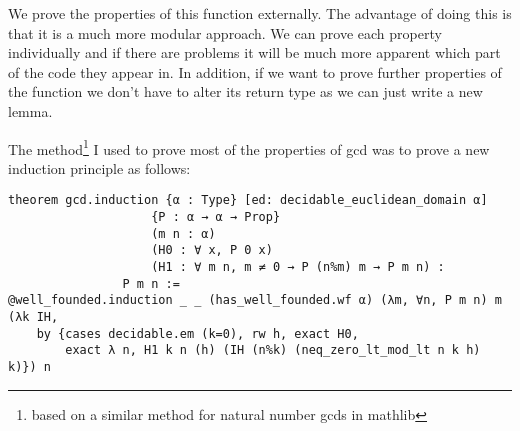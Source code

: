 \documentclass{article}
\begin{document}
We prove the properties of this function externally. 
The advantage of doing this is that it is a much more modular approach.
We can prove each property individually and if there are problems it will be much more apparent which part of the code they appear in.
In addition, if we want to prove further properties of the function we don't have to alter its return type as we can just write a new lemma.

The method\footnote{based on a similar method for natural number gcds in mathlib} I used to prove most of the properties of gcd was to prove a new induction principle as follows:
\begin{lstlisting}
theorem gcd.induction {α : Type} [ed: decidable_euclidean_domain α] 
                    {P : α → α → Prop}
                    (m n : α)
                    (H0 : ∀ x, P 0 x)
                    (H1 : ∀ m n, m ≠ 0 → P (n%m) m → P m n) :
                P m n := 
@well_founded.induction _ _ (has_well_founded.wf α) (λm, ∀n, P m n) m (λk IH,
    by {cases decidable.em (k=0), rw h, exact H0,
        exact λ n, H1 k n (h) (IH (n%k) (neq_zero_lt_mod_lt n k h) k)}) n
\end{lstlisting}



\end{document}
